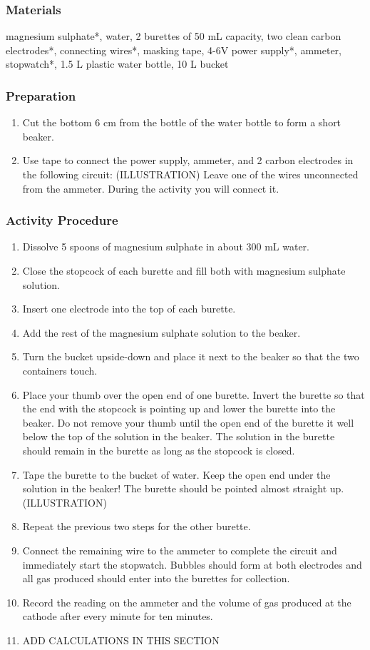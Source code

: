 \subsubsection*{Materials}
magnesium sulphate*, water, 2 burettes of 50 mL capacity, two clean carbon electrodes*, connecting wires*, masking tape, 4-6V power supply*, ammeter, stopwatch*, 1.5 L plastic water bottle, 10 L bucket

\subsubsection*{Preparation}
\begin{enumerate}
\item{Cut the bottom 6 cm from the bottle of the water bottle to form a short beaker.}
\item{Use tape to connect the power supply, ammeter, and 2 carbon electrodes in the following circuit: (ILLUSTRATION)
Leave one of the wires unconnected from the ammeter. During the activity you will connect it.}
\end{enumerate}

\subsubsection*{Activity Procedure}
\begin{enumerate}
\item{Dissolve 5 spoons of magnesium sulphate in about 300 mL water.}
\item{Close the stopcock of each burette and fill both with magnesium sulphate solution.}
\item{Insert one electrode into the top of each burette.}
\item{Add the rest of the magnesium sulphate solution to the beaker.}
\item{Turn the bucket upside-down and place it next to the beaker so that the two containers touch.}
\item{Place your thumb over the open end of one burette. Invert the burette so that the end with the stopcock is pointing up and lower the burette into the beaker. Do not remove your thumb until the open end of the burette it well below the top of the solution in the beaker. The solution in the burette should remain in the burette as long as the stopcock is closed.}
\item{Tape the burette to the bucket of water. Keep the open end under the solution in the beaker! The burette should be pointed almost straight up. (ILLUSTRATION)}
\item{Repeat the previous two steps for the other burette.}
\item{Connect the remaining wire to the ammeter to complete the circuit and immediately start the stopwatch. Bubbles should form at both electrodes and all gas produced should enter into the burettes for collection.}
\item{Record the reading on the ammeter and the volume of gas produced at the cathode after every minute for ten minutes.}
\item{ADD CALCULATIONS IN THIS SECTION}
\end{enumerate}

